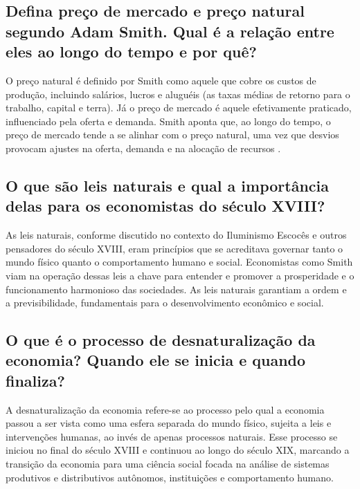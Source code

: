 \documentclass[12pt]{article}
\begin{document}
\subsection{\textbf{Defina preço de mercado e preço natural segundo Adam Smith. Qual é a relação entre eles ao longo do tempo e por quê?}}
O preço natural é definido por Smith como aquele que cobre os custos de produção, incluindo salários, lucros e aluguéis (as taxas médias de retorno para o trabalho, capital e terra). Já o preço de mercado é aquele efetivamente praticado, influenciado pela oferta e demanda. Smith aponta que, ao longo do tempo, o preço de mercado tende a se alinhar com o preço natural, uma vez que desvios provocam ajustes na oferta, demanda e na alocação de recursos .
\subsection{\textbf{O que são leis naturais e qual a importância delas para os economistas do século XVIII?}}
As leis naturais, conforme discutido no contexto do Iluminismo Escocês e outros pensadores do século XVIII, eram princípios que se acreditava governar tanto o mundo físico quanto o comportamento humano e social. Economistas como Smith viam na operação dessas leis a chave para entender e promover a prosperidade e o funcionamento harmonioso das sociedades. As leis naturais garantiam a ordem e a previsibilidade, fundamentais para o desenvolvimento econômico e social.
\subsection{\textbf{O que é o processo de desnaturalização da economia? Quando ele se inicia e quando finaliza?}}
A desnaturalização da economia refere-se ao processo pelo qual a economia passou a ser vista como uma esfera separada do mundo físico, sujeita a leis e intervenções humanas, ao invés de apenas processos naturais. Esse processo se iniciou no final do século XVIII e continuou ao longo do século XIX, marcando a transição da economia para uma ciência social focada na análise de sistemas produtivos e distributivos autônomos, instituições e comportamento humano.
\end{document}
